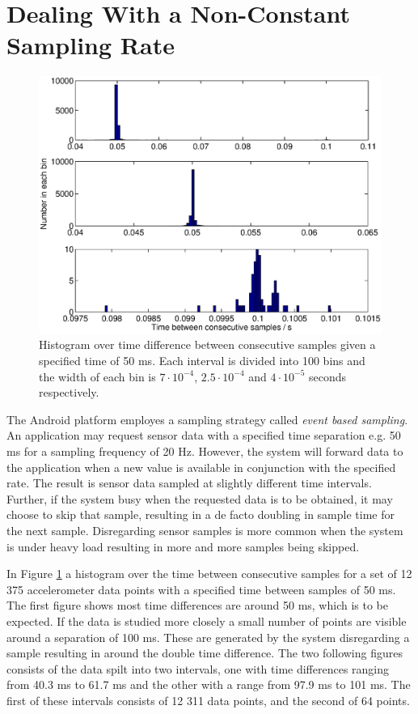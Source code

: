 \documentclass{LTHthesis}
\begin{document}
\section{Dealing With a Non-Constant Sampling Rate}
%
\begin{figure}[!hbt]

\includegraphics[width=1\textwidth ]{images/kinematic/sample_diff}
\caption{Histogram over time difference between consecutive samples given a specified time of 50 ms. Each interval is divided into 100 bins and the width of each bin is $7\cdot10^{-4}$, $2.5\cdot10^{-4}$ and $4\cdot10^{-5}$ seconds respectively.}\label{sample_diff}
\end{figure}
%
The Android platform employes a sampling strategy called \emph{event based sampling}. An application may request sensor data with a specified time separation e.g. 50 ms for a sampling frequency of 20 Hz. However, the system will forward data to the application when a new value is available in conjunction with the specified rate. The result is sensor data sampled at slightly different time intervals. Further, if the system busy when the requested data is to be obtained, it may choose to skip that sample, resulting in a de facto doubling in sample time for the next sample. Disregarding sensor samples is more common when the system is under heavy load resulting in more and more samples being skipped.

In Figure \ref{sample_diff} a histogram over the time between consecutive samples for a set of 12 375 accelerometer data points with a specified time between samples of 50 ms. The first figure shows most time differences are around 50 ms, which is to be expected. If the data is studied more closely a small number of points are visible around a separation of 100 ms. These are generated by the system disregarding a sample resulting in around the double time difference. The two following figures consists of the data spilt into two intervals, one with time differences ranging from 
40.3 ms to 61.7 ms and the other with a range from 97.9 ms to 101 ms. The first of these intervals consists of 12 311 data points, and the second of 64 points. 
\end{document}
